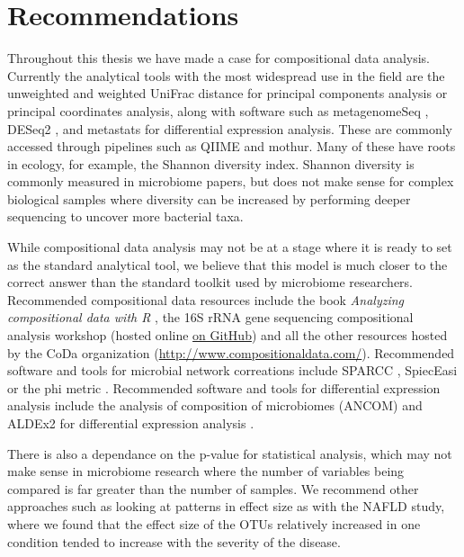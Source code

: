 \section{Recommendations}
Throughout this thesis we have made a case for compositional data analysis. Currently the analytical tools with the most widespread use in the field are the unweighted and weighted UniFrac distance for principal components analysis or principal coordinates analysis, along with software such as metagenomeSeq \cite{paulson2014metagenomeseq}, DESeq2 \cite{love2014moderated}, and metastats \cite{paulson2011metastats} for differential expression analysis. These are commonly accessed through pipelines such as QIIME and mothur. Many of these have roots in ecology, for example, the Shannon diversity index. Shannon diversity is commonly measured in microbiome papers, but does not make sense for complex biological samples where diversity can be increased by performing deeper sequencing to uncover more bacterial taxa.

While compositional data analysis may not be at a stage where it is ready to set as the standard analytical tool, we believe that this model is much closer to the correct answer than the standard toolkit used by microbiome researchers. Recommended compositional data resources include the book \textit{Analyzing compositional data with R} \cite{van2013analyzing}, the 16S rRNA gene sequencing compositional analysis workshop (hosted online \href{https://github.com/ggloor/compositions/blob/master/background_reading/CJM_supplement/workshop.pdf}{on GitHub}) and all the other resources hosted by the CoDa organization (\url{http://www.compositionaldata.com/}). Recommended software and tools for microbial network correations include SPARCC \cite{friedman2012inferring}, SpiecEasi \cite{kurtz2015sparse} or the phi metric \cite{lovell2015proportionality}. Recommended software and tools for differential expression analysis include the analysis of composition of microbiomes (ANCOM) \cite{mandal2015analysis} and ALDEx2 for differential expression analysis \cite{fernandes2014unifying}.

There is also a dependance on the p-value for statistical analysis, which may not make sense in microbiome research where the number of variables being compared is far greater than the number of samples. We recommend other approaches such as looking at patterns in effect size as with the NAFLD study, where we found that the effect size of the OTUs relatively increased in one condition tended to increase with the severity of the disease.


